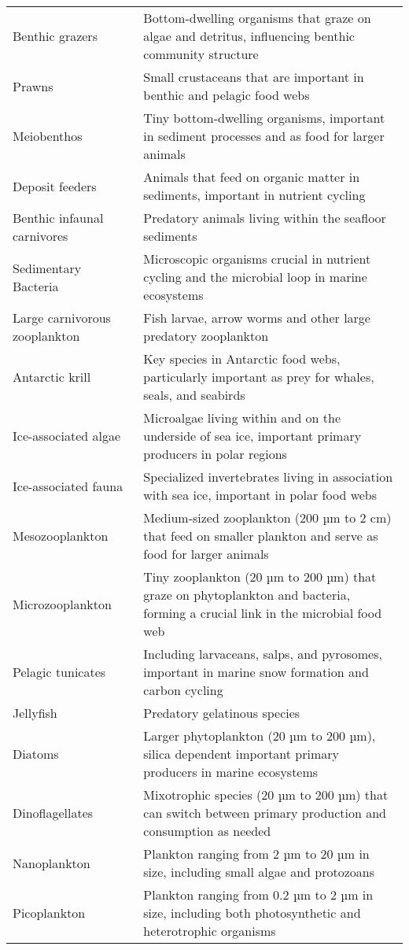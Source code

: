 \begin{longtable}{p{}p{}}
Benthic grazers & Bottom-dwelling organisms that graze on algae and detritus, influencing benthic community structure \\
Prawns & Small crustaceans that are important in benthic and pelagic food webs \\
Meiobenthos & Tiny bottom-dwelling organisms, important in sediment processes and as food for larger animals \\
Deposit feeders & Animals that feed on organic matter in sediments, important in nutrient cycling \\
Benthic infaunal carnivores & Predatory animals living within the seafloor sediments \\
Sedimentary Bacteria & Microscopic organisms crucial in nutrient cycling and the microbial loop in marine ecosystems \\
Large carnivorous zooplankton & Fish larvae, arrow worms and other large predatory zooplankton \\
Antarctic krill & Key species in Antarctic food webs, particularly important as prey for whales, seals, and seabirds \\
Ice-associated algae & Microalgae living within and on the underside of sea ice, important primary producers in polar regions \\
Ice-associated fauna & Specialized invertebrates living in association with sea ice, important in polar food webs \\
Mesozooplankton & Medium-sized zooplankton (200 µm to 2 cm) that feed on smaller plankton and serve as food for larger animals \\
Microzooplankton & Tiny zooplankton (20 µm to 200 µm) that graze on phytoplankton and bacteria, forming a crucial link in the microbial food web \\
Pelagic tunicates & Including larvaceans, salps, and pyrosomes, important in marine snow formation and carbon cycling \\
Jellyfish & Predatory gelatinous species \\
Diatoms & Larger phytoplankton (20 µm to 200 µm), silica dependent important primary producers in marine ecosystems \\
Dinoflagellates & Mixotrophic species (20 µm to 200 µm) that can switch between primary production and consumption as needed \\
Nanoplankton & Plankton ranging from 2 µm to 20 µm in size, including small algae and protozoans \\
Picoplankton & Plankton ranging from 0.2 µm to 2 µm in size, including both photosynthetic and heterotrophic organisms \\

\end{longtable}
